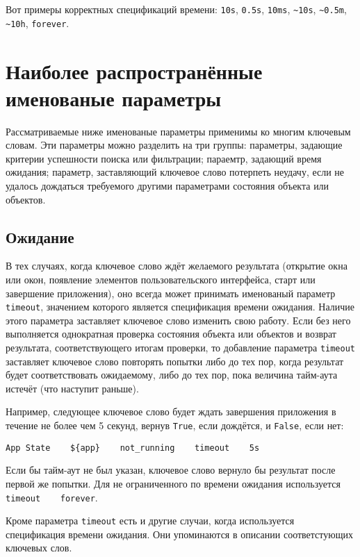 \documentclass[11pt]{book} %
\begin{document}
Вот примеры корректных спецификаций времени: \verb"10s", \verb"0.5s", \verb"10ms", \verb"~10s", \verb"~0.5m", \verb"~10h",  \verb"forever".

\section{Наиболее распространённые именованые параметры}
Рассматриваемые ниже именованые параметры применимы ко многим ключевым словам. Эти параметры можно разделить на три группы: параметры, задающие критерии успешности поиска или фильтрации; параемтр, задающий время ожидания; параметр, заставляющий ключевое слово потерпеть неудачу, если не удалось дождаться требуемого другими параметрами состояния объекта или объектов.

\subsection{Ожидание}

В тех случаях, когда ключевое слово ждёт желаемого результата (открытие окна или окон, появление элементов пользовательского интерфейса, старт или завершение приложения), оно всегда может принимать именованый параметр \verb|timeout|, значением которого является спецификация времени ожидания. Наличие этого параметра заставляет ключевое слово изменить свою работу. Если без него выполняется однократная проверка состояния объекта или объектов и возврат результата, соответствующего итогам проверки, то добавление параметра \verb|timeout| заставляет ключевое слово повторять попытки либо до тех пор, когда результат будет соответствовать ожидаемому, либо до тех пор, пока величина тайм-аута истечёт (что наступит раньше).

Например, следующее ключевое слово будет ждать завершения приложения в течение не более чем 5 секунд, вернув \verb|True|, если дождётся, и \verb|False|, если нет:
\begin{verbatim}
App State    ${app}    not_running    timeout    5s
\end{verbatim}

Если бы тайм-аут не был указан, ключевое слово вернуло бы результат после первой же попытки. Для не ограниченного по времени ожидания используется \verb|timeout    forever|.

Кроме параметра \verb|timeout| есть и другие случаи, когда используется спецификация времени ожидания. Они упоминаются в описании соответстующих ключевых слов.
\end{document}
